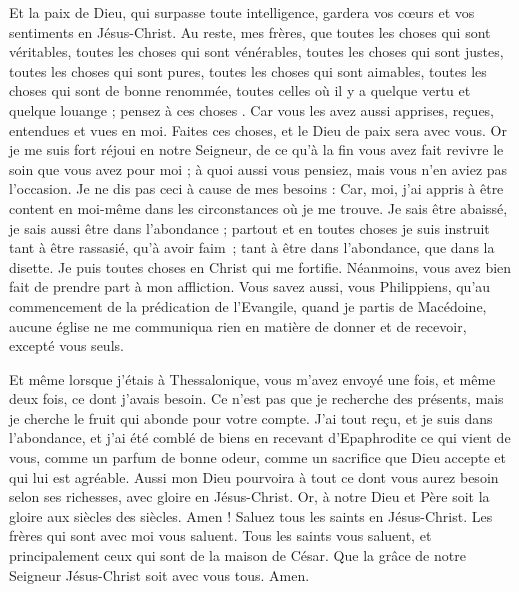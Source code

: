\begin{multicols}{2}
Et la paix de Dieu, qui surpasse toute intelligence, gardera vos cœurs et vos sentiments en Jésus-Christ.
 Au reste, mes frères, que toutes les choses qui sont véritables, toutes les choses qui sont vénérables, toutes les choses qui sont justes, toutes les choses qui sont pures, toutes les choses qui sont aimables, toutes les choses qui sont de bonne renommée, toutes celles où il y a quelque vertu et quelque louange ; pensez à ces choses .
Car vous les avez aussi apprises, reçues, entendues et vues en moi. Faites ces choses, et le Dieu de paix sera avec vous. 
Or je me suis fort réjoui en notre Seigneur, de ce qu'à la fin vous avez fait revivre le soin que vous avez pour moi ; à quoi aussi vous pensiez, mais vous n’en aviez pas l'occasion. 
Je ne dis pas ceci à cause de mes besoins : Car, moi, j’ai appris à être content en moi-même dans les circonstances où je me trouve.
Je sais être abaissé, je sais aussi être dans l'abondance ; partout et en toutes choses je suis instruit tant à être rassasié, qu’à avoir faim ; tant à être dans l’abondance, que dans la disette.
Je puis toutes choses en Christ qui me fortifie.
Néanmoins, vous avez bien fait de prendre part à mon affliction.
Vous savez aussi, vous Philippiens, qu'au commencement de la prédication de l'Evangile, quand je partis de Macédoine, aucune église ne me communiqua rien en matière de donner et de recevoir, excepté vous seuls. 

Et même lorsque j'étais à Thessalonique, vous m'avez envoyé une fois, et même deux fois, ce dont j'avais besoin. 
Ce n'est pas que je recherche des présents, mais je cherche le fruit qui abonde pour votre compte.
J'ai tout reçu, et je suis dans l'abondance, et j'ai été comblé de biens en recevant d'Epaphrodite ce qui vient de vous, comme un parfum de bonne odeur, comme un sacrifice que Dieu accepte et qui lui est agréable.
Aussi mon Dieu pourvoira à tout ce dont vous aurez besoin selon ses richesses, avec gloire en Jésus-Christ. 
Or, à notre Dieu et Père soit la gloire aux siècles des siècles. Amen !
Saluez tous les saints en Jésus-Christ. Les frères qui sont avec moi vous saluent.
Tous les saints vous saluent, et principalement ceux qui sont de la maison de César.
Que la grâce de notre Seigneur Jésus-Christ soit avec vous tous. Amen.
\PPE{}
\end{multicols}
